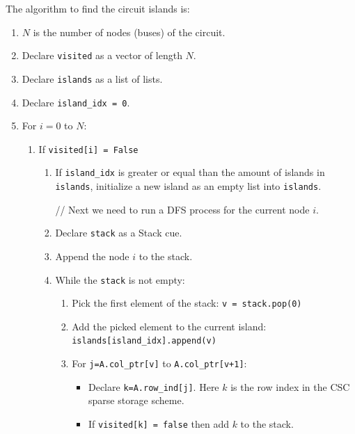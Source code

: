 \documentclass[nols,a4paper,twoside,notoc,fleqn]{tufte-book}
\begin{document}

The algorithm to find the circuit islands is:

\begin{enumerate}
	\item $N$ is the number of nodes (buses) of the circuit.
	\item Declare \verb|visited| as a vector of length $N$.
	\item Declare \verb|islands| as a list of lists.
	\item Declare \verb|island_idx = 0|.
	\item For $i=0$ to $N$:
	
	\begin{enumerate}
		\item If \verb|visited[i] = False|
		
		\begin{enumerate}
			\item If \verb|island_idx| is greater or equal than the amount of islands in \verb|islands|, initialize a new island as an empty list into \verb|islands|.
			
			// Next we need to run a DFS process for the current node $i$.
			
			\item Declare \verb|stack| as a Stack cue.
			\item Append the node $i$ to the stack.
			
			\item While the \verb|stack| is not empty:
			
			\begin{enumerate}
				\item Pick the first element of the stack: \verb|v = stack.pop(0)|
				
				\item Add the picked element to the current island: \verb|islands[island_idx].append(v)|
				
				\item For \verb|j=A.col_ptr[v]| to \verb|A.col_ptr[v+1]|:
				
				\begin{itemize}
					\item Declare \verb|k=A.row_ind[j]|. Here $k$ is the row index in the CSC sparse storage scheme.
					
					\item If \verb|visited[k] = false| then add $k$ to the stack.
				\end{itemize}
				

\end{enumerate}
\end{enumerate}
\end{enumerate}
\end{enumerate}
\end{document}
